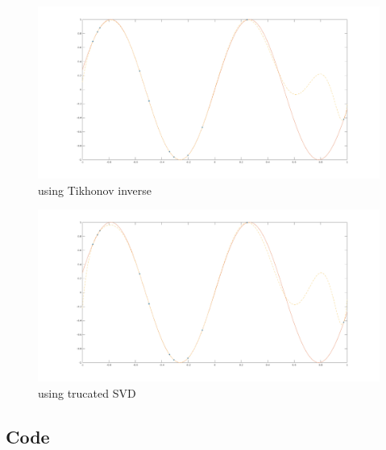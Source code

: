 \documentclass[a4paper, 11pt]{article}
\begin{document}
\begin{figure}[htbp]
\centering
\includegraphics[scale=0.3]{figure/fig2.png}
\caption{using Tikhonov inverse}
\label{fig2}
\end{figure}

\begin{figure}[htbp]
\centering
\includegraphics[scale=0.3]{figure/fig3.png}
\caption{using trucated SVD}
\label{fig3}
\end{figure}

\newpage 

\subsection*{Code}
\end{document}
